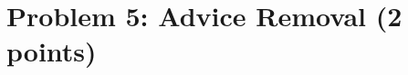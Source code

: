 \documentclass{article}
\renewcommand{\P}{\mathbf{P}}
\def \BPL{{\mathbf{BPL}}}
\begin{document}






































\newpage
\section*{Problem 5: Advice Removal (2 points)}
\end{document}

